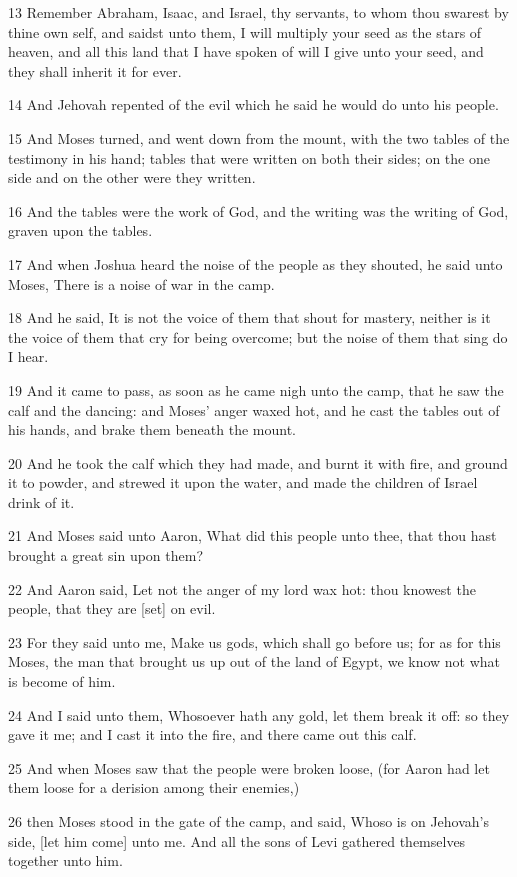 \par 13 Remember Abraham, Isaac, and Israel, thy servants, to whom thou swarest by thine own self, and saidst unto them, I will multiply your seed as the stars of heaven, and all this land that I have spoken of will I give unto your seed, and they shall inherit it for ever.
\par 14 And Jehovah repented of the evil which he said he would do unto his people.
\par 15 And Moses turned, and went down from the mount, with the two tables of the testimony in his hand; tables that were written on both their sides; on the one side and on the other were they written.
\par 16 And the tables were the work of God, and the writing was the writing of God, graven upon the tables.
\par 17 And when Joshua heard the noise of the people as they shouted, he said unto Moses, There is a noise of war in the camp.
\par 18 And he said, It is not the voice of them that shout for mastery, neither is it the voice of them that cry for being overcome; but the noise of them that sing do I hear.
\par 19 And it came to pass, as soon as he came nigh unto the camp, that he saw the calf and the dancing: and Moses' anger waxed hot, and he cast the tables out of his hands, and brake them beneath the mount.
\par 20 And he took the calf which they had made, and burnt it with fire, and ground it to powder, and strewed it upon the water, and made the children of Israel drink of it.
\par 21 And Moses said unto Aaron, What did this people unto thee, that thou hast brought a great sin upon them?
\par 22 And Aaron said, Let not the anger of my lord wax hot: thou knowest the people, that they are [set] on evil.
\par 23 For they said unto me, Make us gods, which shall go before us; for as for this Moses, the man that brought us up out of the land of Egypt, we know not what is become of him.
\par 24 And I said unto them, Whosoever hath any gold, let them break it off: so they gave it me; and I cast it into the fire, and there came out this calf.
\par 25 And when Moses saw that the people were broken loose, (for Aaron had let them loose for a derision among their enemies,)
\par 26 then Moses stood in the gate of the camp, and said, Whoso is on Jehovah's side, [let him come] unto me. And all the sons of Levi gathered themselves together unto him.
